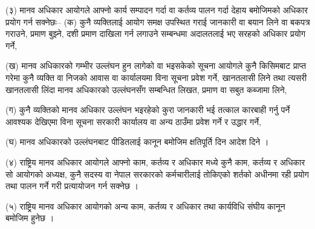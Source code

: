 (३) मानव अधिकार आयोगले आफ्नो कार्य सम्पादन गर्दा वा कर्तव्य पालन गर्दा देहाय बमोजिमको अधिकार प्रयोग गर्न सक्नेछः–
(क) कुनै व्यक्तिलाई आयोग समक्ष उपस्थित गराई जानकारी वा बयान लिने वा बकपत्र गराउने, प्रमाण बुझ्ने, दशी प्रमाण दाखिला गर्न लगाउने सम्बन्धमा अदालतलाई भए सरहको अधिकार प्रयोग गर्ने,

(ख) मानव अधिकारको गम्भीर उल्लंघन हुन लागेको वा भइसकेको सूचना आयोगले कुनै किसिमबाट प्राप्त गरेमा कुनै व्यक्ति वा
निजको आवास वा कार्यालयमा विना सूचना प्रवेश गर्ने, खानतलासी लिने तथा त्यसरी खानतलासी लिंदा मानव अधिकारको उल्लंघनसँग सम्बन्धित लिखत, प्रमाण वा सबुत कब्जामा लिने,

(ग) कुनै व्यक्तिको मानव अधिकार उल्लंघन भइरहेको कुरा जानकारी भई तत्काल कारबाही गर्नु पर्ने आवश्यक देखिएमा विना सूचना सरकारी कार्यालय वा अन्य ठाउँमा प्रवेश गर्ने र उद्धार गर्ने,

(घ) मानव अधिकारको उल्लंघनबाट पीडितलाई कानून बमोजिम क्षतिपूर्ति दिन आदेश दिने ।

(४) राष्ट्रिय मानव अधिकार आयोगले आफ्नो काम, कर्तव्य र अधिकार मध्ये कुनै काम, कर्तव्य र अधिकार सो आयोगको अध्यक्ष, कुनै
सदस्य वा नेपाल सरकारको कर्मचारीलाई तोकिएको शर्तको अधीनमा रही प्रयोग तथा पालन गर्ने गरी प्रत्यायोजन गर्न सक्नेछ ।

(५) राष्ट्रिय मानव अधिकार आयोगको अन्य काम, कर्तव्य र अधिकार तथा कार्यविधि संघीय कानून बमोजिम हुनेछ ।